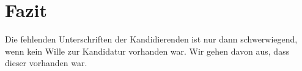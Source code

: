 \documentclass[a4paper]{scrartcl}
\begin{document}











\section{Fazit}

 Die fehlenden Unterschriften der Kandidierenden ist nur dann schwerwiegend, wenn kein Wille zur Kandidatur vorhanden war. Wir gehen davon aus, dass dieser vorhanden war.


\end{document}

